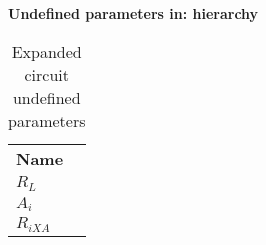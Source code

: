 {\textbf{Undefined parameters in: hierarchy}}

\begin{table}[H]
\centering
\begin{tabular}[c]{l}
\textbf{Name} \\ 
\rowcolor{myyellow}
$R_{L}$ \\ 
$A_{i}$ \\ 
\rowcolor{myyellow}
$R_{i XA}$ \\ 
\end{tabular}
\caption{Expanded circuit undefined parameters}
\end{table}

